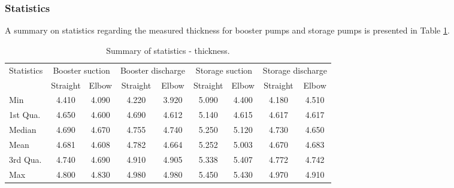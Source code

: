 \subsubsection{Statistics} \label{ch05_statistics}
A summary on statistics regarding the measured thickness for booster pumps and storage pumps is presented in Table \ref{ch05_tbl_thicknesssta}.
\begin{table}[h]
	\caption{Summary of statistics - thickness.}
	\label{ch05_tbl_thicknesssta}
	{\footnotesize
\begin{tabular}{l|l|l|l|l|l|l|l|l}
	\hline
	Statistics & \multicolumn{2}{c|}{Booster suction} & \multicolumn{2}{c|}{Booster discharge} & \multicolumn{2}{c|}{Storage suction} & \multicolumn{2}{c}{Storage discharge} \\ 
	\cline{2-9}
	& \multicolumn{1}{c|}{Straight} & \multicolumn{1}{c|}{Elbow} & \multicolumn{1}{c|}{Straight} & \multicolumn{1}{c|}{Elbow} & \multicolumn{1}{c|}{Straight} & \multicolumn{1}{c|}{Elbow} & \multicolumn{1}{c|}{Straight} & \multicolumn{1}{c}{Elbow} \\ 
	\hline
	Min & \multicolumn{1}{c|}{4.410} & \multicolumn{1}{c|}{4.090} & \multicolumn{1}{c|}{4.220} & \multicolumn{1}{c|}{3.920} & \multicolumn{1}{c|}{5.090} & \multicolumn{1}{c|}{4.400 } & \multicolumn{1}{c|}{4.180} & \multicolumn{1}{c}{4.510 } \\ 
	1st Qua. & \multicolumn{1}{c|}{4.650} & \multicolumn{1}{c|}{4.600} & \multicolumn{1}{c|}{4.690} & \multicolumn{1}{c|}{4.612} & \multicolumn{1}{c|}{5.140} & \multicolumn{1}{c|}{4.615 } & \multicolumn{1}{c|}{4.617} & \multicolumn{1}{c}{4.617} \\ 
	Median & \multicolumn{1}{c|}{4.690} & \multicolumn{1}{c|}{4.670} & \multicolumn{1}{c|}{4.755} & \multicolumn{1}{c|}{4.740 } & \multicolumn{1}{c|}{5.250 } & \multicolumn{1}{c|}{5.120} & \multicolumn{1}{c|}{4.730} & \multicolumn{1}{c}{4.650} \\ 
	Mean & \multicolumn{1}{c|}{4.681} & \multicolumn{1}{c|}{4.608} & \multicolumn{1}{c|}{4.782} & \multicolumn{1}{c|}{4.664} & \multicolumn{1}{c|}{5.252} & \multicolumn{1}{c|}{5.003} & \multicolumn{1}{c|}{4.670} & \multicolumn{1}{c}{4.683 } \\ 
	3rd Qua. & \multicolumn{1}{c|}{4.740} & \multicolumn{1}{c|}{4.690} & \multicolumn{1}{c|}{4.910 } & \multicolumn{1}{c|}{4.905} & \multicolumn{1}{c|}{5.338} & \multicolumn{1}{c|}{5.407} & \multicolumn{1}{c|}{4.772} & \multicolumn{1}{c}{4.742 } \\ 
	Max & \multicolumn{1}{c|}{4.800} & \multicolumn{1}{c|}{4.830 } & \multicolumn{1}{c|}{4.980} & \multicolumn{1}{c|}{4.980} & \multicolumn{1}{c|}{5.450} & \multicolumn{1}{c|}{5.430} & \multicolumn{1}{c|}{4.970} & \multicolumn{1}{c}{4.910} \\ 
	\hline
\end{tabular}
	}
\end{table}

